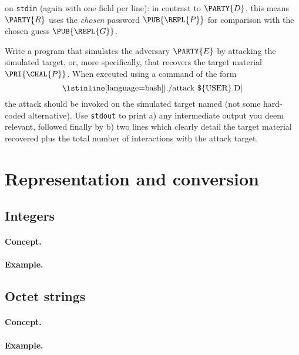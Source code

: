 \documentclass[crop={false},multi={true},tikz={true}]{standalone}
\begin{document}
\noindent
on \lstinline[language={bash}]{stdin} (again with one field per line):
in contrast to $\PARTY{D}$, this means $\PARTY{R}$ uses the
{\em chosen} password $\PUB{\REPL{P}}$
for comparison with the
     chosen  guess    $\PUB{\REPL{G}}$.


      Write a program that simulates the adversary $\PARTY{E}$ by attacking
      the simulated target, or, more specifically, that recovers the target 
      material $\PRI{\CHAL{P}}$.  
      When executed using a command of the form
      \[
      \mbox{\lstinline[language={bash}]|./attack \$\{USER\}.D|}
      \]
      the attack should be invoked on the simulated target named (not some
      hard-coded alternative).  Use \lstinline[language={bash}]{stdout} to 
      print 
      a) any intermediate output you deem relevant, followed finally by 
      b) two lines which clearly detail the target material recovered plus
         the total number of interactions with the attack target.


\ifstandalone
\printbibliography
\fi


\ifstandalone
\appendix 
\section{Representation and conversion}

\subsection{Integers}

\paragraph{Concept.}

\paragraph{Example.}


\subsection{Octet strings}

\paragraph{Concept.}

\paragraph{Example.}

\fi

\end{document}
